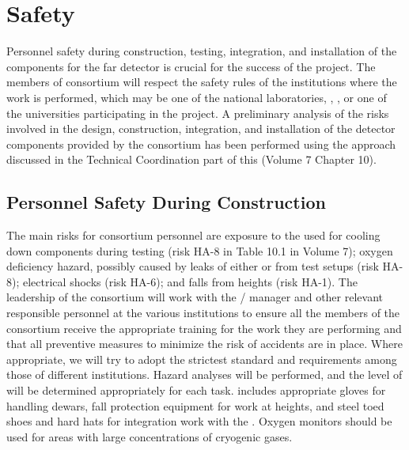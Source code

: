 \section{Safety}
\label{sec:fdsp-tpcelec-safety}

Personnel safety during construction, testing, integration,
and installation of the  components for the 
 far detector is crucial for the success
of the project. The members of  consortium will
respect the safety rules of the institutions where the work is
performed, which may be one of the national laboratories, , ,
or one of the universities participating in the project. A
preliminary analysis of the risks involved in the design,
construction, integration, and installation of the detector
components provided by the  consortium has been
performed using the approach discussed in the Technical
Coordination part of this  (Volume 7 Chapter 10). 


\subsection{Personnel Safety During Construction}
\label{sec:fdsp-tpcelec-safety-personnel}

The main risks for consortium personnel are exposure to
the \lntwo used for cooling down components during testing (risk HA-8
in Table 10.1 in Volume 7);
oxygen deficiency hazard, possibly caused by leaks
of either \lntwo or  from test setups (risk HA-8);
electrical shocks (risk HA-6); and falls from heights (risk HA-1). The leadership of the
 consortium will work with the /
 manager and other relevant responsible personnel at the
various institutions to ensure all the members of the
consortium receive the appropriate training for the work they
are performing and that all preventive measures to minimize
the risk of accidents are in place. Where appropriate,
we will try to adopt the strictest standard and requirements among
those of different institutions. Hazard analyses will be performed,
and the level of  will be determined
appropriately for each task.  includes 
appropriate gloves for handling \lntwo dewars, fall
protection equipment for work at heights, and steel toed shoes and
hard hats for integration work with the . Oxygen
monitors should be used for areas with large concentrations of
cryogenic gases.


